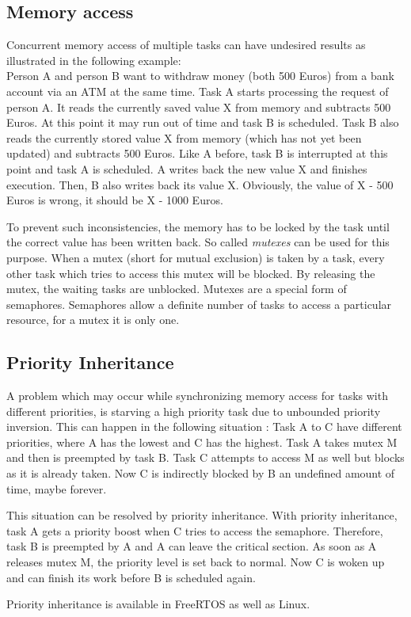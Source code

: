 \subsection{Memory access}
Concurrent memory access of multiple tasks can have undesired results as illustrated in the following example:\\
Person A and person B want to withdraw money (both 500 Euros) from a bank account via an ATM at the same time.
Task A starts processing the request of person A.
It reads the currently saved value X from memory and subtracts 500 Euros.
At this point it may run out of time and task B is scheduled.
Task B also reads the currently stored value X from memory (which has not yet been updated) and subtracts 500 Euros.
Like A before, task B is interrupted at this point and task A is scheduled.
A writes back the new value X and finishes execution.
Then, B also writes back its value X.
Obviously, the value of X - 500 Euros is wrong, it should be X - 1000 Euros. 
\par
To prevent such inconsistencies, the memory has to be locked by the task until the correct value has been written back.
So called \textit{mutexes} can be used for this purpose.
When a mutex (short for mutual exclusion) is taken by a task, every other task which tries to access this mutex will be blocked.
By releasing the mutex, the waiting tasks are unblocked.
Mutexes are a special form of semaphores.
Semaphores allow a definite number of tasks to access a particular resource, for a mutex it is only one.

\subsection{Priority Inheritance}\label{ss_priority_inheritance}
A problem which may occur while synchronizing memory access for tasks with different priorities, is starving a high priority task due to unbounded priority inversion.
This can happen in the following situation \cite{rostedt:iotrtp}:
Task A to C have different priorities, where A has the lowest and C has the highest.
Task A takes mutex M and then is preempted by task B.
Task C attempts to access M as well but blocks as it is already taken.
Now C is indirectly blocked by B an undefined amount of time, maybe forever.
\par
This situation can be resolved by priority inheritance.
With priority inheritance, task A gets a priority boost when C tries to access the semaphore.
Therefore, task B is preempted by A and A can leave the critical section.
As soon as A releases mutex M, the priority level is set back to normal.
Now C is woken up and can finish its work before B is scheduled again.
\par
Priority inheritance is available in FreeRTOS as well as Linux.

